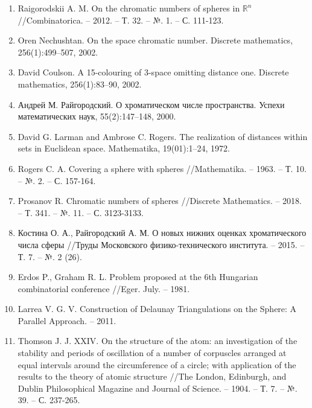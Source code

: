 \begin{enumerate}[leftmargin=0.5cm,topsep=0pt,itemsep=-1ex,partopsep=1ex,parsep=1ex,ref=\arabic{*},label=\arabic{*}.]
\item\label{bib:RaiSphere}
Raigorodskii A. M. On the chromatic numbers of spheres in $\mathbb{R}^n$ //Combinato\-ri\-ca. – 2012. – Т. 32. – №. 1. – С. 111-123.

\item\label{bib:Nech}
Oren Nechushtan. On the space chromatic number. Discrete mathematics, 256(1):499–507, 2002.

\item\label{bib:Coul}
David Coulson. A 15-colouring of 3-space omitting distance one. Discrete mathematics, 256(1):83–90, 2002.

\item\label{bib:Rai1}
Андрей М. Райгородский. О хроматическом числе пространства. Успехи математических наук, 55(2):147–148, 2000.

\item\label{bib:Larm}
David G. Larman and Ambrose C. Rogers. The realization of distances within sets in Euclidean space. Mathematika, 19(01):1–24, 1972. 

\item\label{bib:Rogers}
Rogers C. A. Covering a sphere with spheres //Mathematika. – 1963. – Т. 10. – №. 2. – С. 157-164.

\item\label{bib:Pros}
Prosanov R. Chromatic numbers of spheres //Discrete Mathematics. – 2018. – Т. 341. – №. 11. – С. 3123-3133.

\item\label{bib:Kostina}
Костина О. А., Райгородский А. М. О новых нижних оценках хроматического числа сферы //Труды Московского физико-технического института. – 2015. – Т. 7. – №. 2 (26).

\item\label{bib:ErdosGraham}
Erdos P., Graham R. L. Problem proposed at the 6th Hungarian combinato\-ri\-al conference //Eger. July. – 1981.

\item\label{bib:Larrea}
Larrea V. G. V. Construction of Delaunay Triangulations on the Sphere: A Parallel Approach. – 2011.

\item\label{bib:Thomson}
Thomson J. J. XXIV. On the structure of the atom: an investigation of the stability and periods of oscillation of a number of corpuscles arranged at equal intervals around the circumference of a circle; with application of the results to the theory of atomic structure //The London, Edinburgh, and Dublin Philosophical Magazine and Journal of Science. – 1904. – Т. 7. – №. 39. – С. 237-265.


\end{enumerate}
